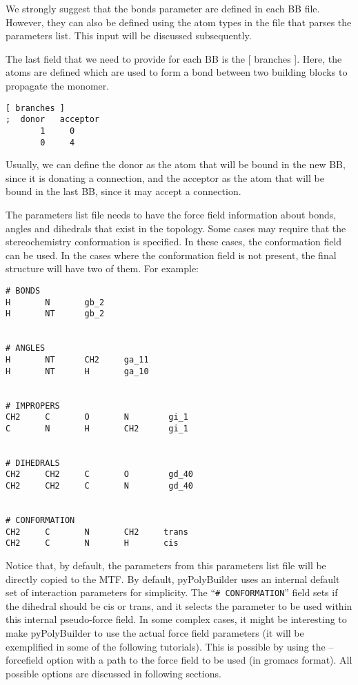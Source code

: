 \documentclass[12pt]{article}
\begin{document}
We strongly suggest that the bonds parameter are defined in each BB file.
However, they can also be defined using the atom types in the file that parses the parameters list.
This input will be discussed subsequently.

The last field that we need to provide for each BB is the [ branches ].
Here, the atoms are defined which are used to form a bond between two building blocks to propagate the monomer.
\begin{lstlisting}
[ branches ]
;  donor   acceptor
       1	 0
       0	 4
\end{lstlisting}

Usually, we can define the donor as the atom that will be bound in the new BB, since it is donating a connection, and the acceptor as the atom that will be bound in the last BB, since it may accept a connection.

The parameters list file needs to have the force field information about bonds, angles and dihedrals that exist in the topology.
Some cases may require that the stereochemistry conformation is specified.
In these cases, the conformation field can be used. In the cases where the conformation field is not present, the  final structure will have two of them. For example:

\begin{lstlisting}
# BONDS
H       N       gb_2
H       NT      gb_2
   

# ANGLES
H       NT      CH2     ga_11
H       NT      H       ga_10


# IMPROPERS
CH2     C       O       N        gi_1
C       N       H       CH2      gi_1


# DIHEDRALS
CH2     CH2     C       O        gd_40
CH2     CH2     C       N        gd_40


# CONFORMATION
CH2     C       N       CH2     trans
CH2     C       N       H       cis  
\end{lstlisting}

Notice that, by default, the parameters from this parameters list file will be directly copied to the MTF.
By default, pyPolyBuilder uses an internal default set of interaction parameters for simplicity.
The ``\texttt{\# CONFORMATION}'' field sets if the dihedral should be cis or trans, and it selects the parameter to be used within this internal pseudo-force field.
In some complex cases, it might be interesting to make pyPolyBuilder to use the actual force field parameters (it will be exemplified in some of the following tutorials).
This is possible by using the --forcefield option with a path to the force field to be used (in gromacs format).
All possible options are discussed in following sections.
\end{document}
